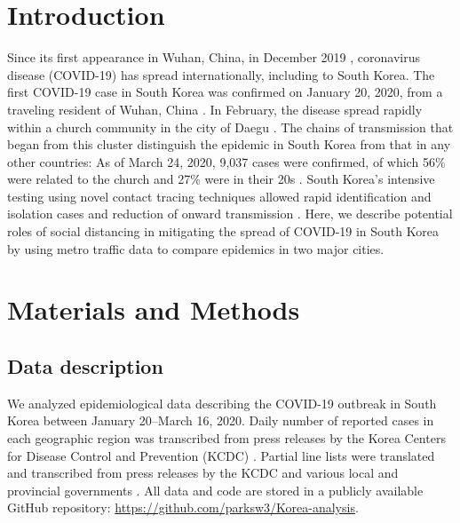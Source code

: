 \documentclass[12pt]{article}
\date{\today}
\begin{document}


\pagebreak

\section{Introduction}

Since its first appearance in Wuhan, China, in December 2019 \citep{pneumonia}, coronavirus disease (COVID-19) has spread internationally, including to South Korea.
The first COVID-19 case in South Korea was confirmed on January 20, 2020, from a traveling resident of Wuhan, China \citep{kcdc}.
In February, the disease spread rapidly within a church community in the city of Daegu \citep{kcdc}.
The chains of transmission that began from this cluster distinguish the epidemic in South Korea from that in any other countries:
As of March 24, 2020, 9,037 cases were confirmed, of which 56\% were related to the church and 27\% were in their 20s \citep{kcdc}.
South Korea's intensive testing using novel contact tracing techniques allowed rapid identification and isolation cases and reduction of onward transmission \citep{fergusonimpact, tracingkorea, science}.
Here, we describe potential roles of social distancing in mitigating the spread of COVID-19 in South Korea by using metro traffic data to compare epidemics in two major cities.

\section{Materials and Methods}

\subsection{Data description}

We analyzed epidemiological data describing the COVID-19 outbreak in South Korea between January 20--March 16, 2020.
Daily number of reported cases in each geographic region was transcribed from press releases by the Korea Centers for Disease Control and Prevention (KCDC) \cite{kcdc}.
Partial line lists were translated and transcribed from press releases by the KCDC and various local and provincial governments \cite{seoul, busan, gwangju, ulsan, gyeonggi, daegu, gyeongnam}.
All data and code are stored in a publicly available GitHub repository: \url{https://github.com/parksw3/Korea-analysis}.
\end{document}

